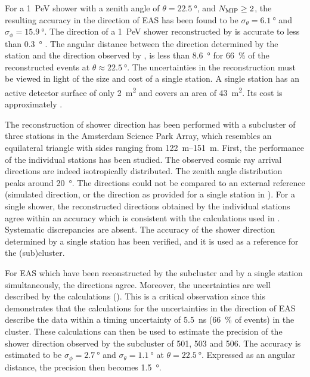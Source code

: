 For a \SI{1}{\peta\electronvolt} shower with a zenith angle of $\theta =
\SI{22.5}{\degree}$, and $N_\mathrm{\mip} \geq 2$, the resulting accuracy in the
direction of EAS has been found to be $\sigma_\theta = \SI{6.1}{\degree}$ and
$\sigma_\phi = \SI{15.9}{\degree}$. The direction of a
\SI{1}{\peta\electronvolt} shower reconstructed by \kascade is accurate to less
than \SI{0.3}{\degree} \cite{Antoni:2003gd}.
The angular distance between the direction determined by the \hisparc station
and the direction observed by \kascade, is less than \SI{8.6}{\degree} for
\SI{66}{\percent} of the reconstructed events at $\theta \approx
\SI{22.5}{\degree}$.
The uncertainties in the reconstruction must be viewed in light of the size and
cost of a single station.
A single station has an active detector surface of only \SI{2}{\square\meter}
and covers an area of \SI{43}{\square\meter}. Its cost is approximately
.

The reconstruction of shower direction has been performed with a subcluster of
three stations in the Amsterdam Science Park Array, which resembles an
equilateral triangle with sides ranging from \SIrange{122}{151}{\meter}.
First, the performance of the individual stations has been studied. The observed
cosmic ray arrival directions are indeed isotropically distributed. The zenith
angle distribution peaks around \SI{20}{\degree}.
The directions could not be compared to an external reference (simulated
direction, or the direction as provided for a single station in \kascade).
For a single shower, the reconstructed directions obtained by the individual stations agree within an
accuracy which is consistent with the calculations used in
. Systematic discrepancies are absent. The
accuracy of the shower direction determined by a single station has been
verified, and it is used as a reference for the (sub)cluster.

For EAS which have been reconstructed by the subcluster and by a single station
simultaneously, the directions agree. Moreover, the uncertainties are well
described by the calculations (). This is a
critical observation since this demonstrates that the calculations for the
uncertainties in the direction of EAS describe the data within a timing
uncertainty of \SI{5.5}{\nano\second} (\SI{66}{\percent} of events) in the
cluster.
These calculations can then be used to estimate the precision of the shower
direction observed by the subcluster of 501, 503 and 506. The accuracy is
estimated to be $\sigma_\phi = \SI{2.7}{\degree}$ and $\sigma_\theta =
\SI{1.1}{\degree}$ at $\theta = \SI{22.5}{\degree}$. Expressed as an angular
distance, the precision then becomes \SI{1.5}{\degree}.


